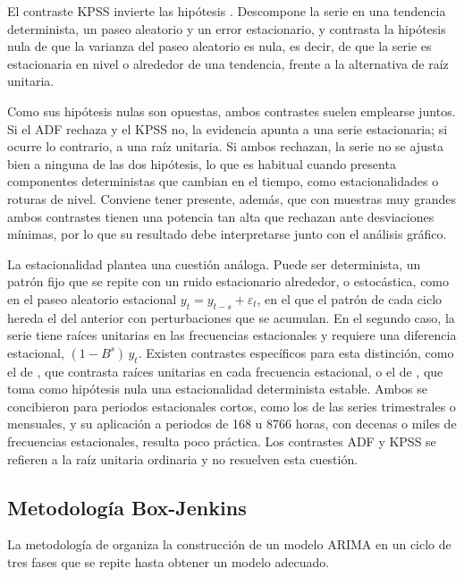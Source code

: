 El contraste KPSS invierte las hipótesis
\parencite{kwiatkowski1992testing}. Descompone la serie en una tendencia
determinista, un paseo aleatorio y un error estacionario, y contrasta la
hipótesis nula de que la varianza del paseo aleatorio es nula, es decir, de
que la serie es estacionaria en nivel o alrededor de una tendencia, frente a
la alternativa de raíz unitaria.

Como sus hipótesis nulas son opuestas, ambos contrastes suelen emplearse
juntos. Si el ADF rechaza y el KPSS no, la evidencia apunta a una serie
estacionaria; si ocurre lo contrario, a una raíz unitaria. Si ambos
rechazan, la serie no se ajusta bien a ninguna de las dos hipótesis, lo que
es habitual cuando presenta componentes deterministas que cambian en el
tiempo, como estacionalidades o roturas de nivel. Conviene tener presente,
además, que con muestras muy grandes ambos contrastes tienen una potencia
tan alta que rechazan ante desviaciones mínimas, por lo que su resultado
debe interpretarse junto con el análisis gráfico.

La estacionalidad plantea una cuestión análoga. Puede ser determinista, un
patrón fijo que se repite con un ruido estacionario alrededor, o
estocástica, como en el paseo aleatorio estacional
$y_t = y_{t-s} + \varepsilon_t$, en el que el patrón de cada ciclo hereda el
del anterior con perturbaciones que se acumulan. En el segundo caso, la
serie tiene raíces unitarias en las frecuencias estacionales y requiere una
diferencia estacional, $(1 - B^s)\, y_t$. Existen contrastes específicos para
esta distinción, como el de \textcite{hylleberg1990seasonal}, que contrasta
raíces unitarias en cada frecuencia estacional, o el de
\textcite{canova1995seasonal}, que toma como hipótesis nula una
estacionalidad determinista estable. Ambos se concibieron para periodos
estacionales cortos, como los de las series trimestrales o mensuales, y su
aplicación a periodos de 168 u 8766 horas, con decenas o miles de
frecuencias estacionales, resulta poco práctica. Los
contrastes ADF y KPSS se refieren a la raíz unitaria ordinaria y no
resuelven esta cuestión.

\subsection{Metodología Box-Jenkins}\label{sec:box-jenkins}

La metodología de \textcite{box2015time} organiza la construcción de un
modelo ARIMA en un ciclo de tres fases que se repite hasta obtener un modelo
adecuado.

